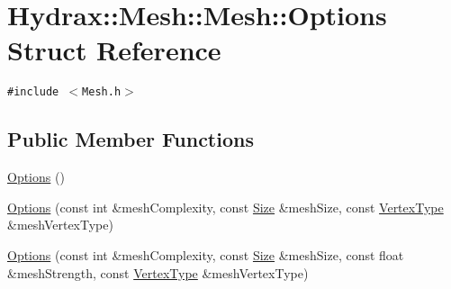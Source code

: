 \hypertarget{struct_hydrax_1_1_mesh_1_1_options}{
\section{Hydrax::Mesh::Mesh::Options Struct Reference}
\label{struct_hydrax_1_1_mesh_1_1_options}
}
{\tt \#include $<$Mesh.h$>$}

\subsection*{Public Member Functions}
\begin{CompactItemize}
\item 
\hyperlink{struct_hydrax_1_1_mesh_1_1_options_066b70dbf34f7b006350f2fe804ab0f2}{Options} ()
\item 
\hyperlink{struct_hydrax_1_1_mesh_1_1_options_d47ad4179acb237742edc21250e85841}{Options} (const int \&meshComplexity, const \hyperlink{struct_hydrax_1_1_size}{Size} \&meshSize, const \hyperlink{class_hydrax_1_1_mesh_5409dc682ec836d1922dc193fc1bf559}{VertexType} \&meshVertexType)
\item 
\hyperlink{struct_hydrax_1_1_mesh_1_1_options_803afc2a1b366b8cdea3a400201aa78e}{Options} (const int \&meshComplexity, const \hyperlink{struct_hydrax_1_1_size}{Size} \&meshSize, const float \&meshStrength, const \hyperlink{class_hydrax_1_1_mesh_5409dc682ec836d1922dc193fc1bf559}{VertexType} \&meshVertexType)
\end{CompactItemize}
